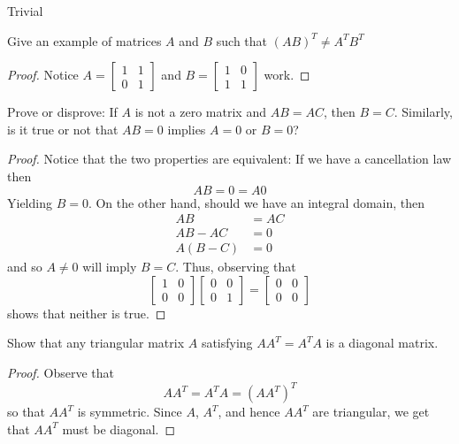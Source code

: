 \begin{problem} \label{P.1.7}
    Trivial
\end{problem}

\begin{problem} \label{P.1.8}
    Give an example of matrices \( A \) and \( B \) such that \( (AB)^T \neq A^TB^T \)
        \begin{proof}
            Notice \( A = \left[ \begin{matrix} 1 & 1 \\ 0 & 1 \end{matrix} \right] \) and \( B = \left[ \begin{matrix} 1 & 0 \\ 1 & 1 \end{matrix} \right] \) work.
        \end{proof}
\end{problem}

\begin{problem} \label{P.1.9}
    Prove or disprove: If \( A \) is not a zero matrix and \( AB = AC \), then \( B = C \). Similarly, is it true or not that \( AB = 0 \) implies \( A = 0 \) or \( B = 0 \)?
    
    \begin{proof}
        Notice that the two properties are equivalent: If we have a cancellation law then
        \[ AB = 0 = A0 \]
        Yielding \( B = 0 \). On the other hand, should we have an integral domain, then 
        \begin{align*}
            AB &= AC \\
            AB - AC &= 0 \\
            A(B-C) &= 0
        \end{align*}
        and so \( A \neq 0 \) will imply \( B = C \). Thus, observing that 
        \[
        \begin{bmatrix} 1 & 0 \\ 0 & 0 \end{bmatrix} \begin{bmatrix} 0 & 0 \\ 0 & 1 \end{bmatrix} = \begin{bmatrix} 0 & 0 \\ 0 & 0 \end{bmatrix}
        \]
        shows that neither is true.
    \end{proof}
\end{problem}

\begin{problem} \label{P.1.10}
    Show that any triangular matrix \( A \) satisfying \( AA^T = A^TA \) is a diagonal matrix.
    
    \begin{proof}
        Observe that
        \[ AA^T = A^TA = (AA^T)^T \]
        so that \( AA^T \) is symmetric. Since \( A \), \( A^T \), and hence \( AA^T \) are triangular, we get that \( AA^T \) must be diagonal.
    \end{proof}
\end{problem}

